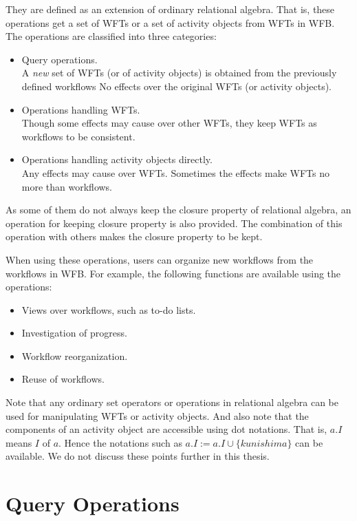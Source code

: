 They are defined as an extension of ordinary relational algebra.  That
is, these operations get a set of WFTs or a set of activity objects from
WFTs in WFB\@.  The operations are classified into three categories:
\begin{itemize}
 \item Query operations.\\
       A {\it new} set of WFTs (or of activity objects) is obtained from
       the previously defined workflows  No effects over the original
       WFTs (or activity objects).
 \item Operations handling WFTs.\\
       Though some effects may cause over other WFTs, they keep WFTs as
       workflows to be consistent.
 \item Operations handling activity objects directly.\\
       Any effects may cause over WFTs.  Sometimes the effects make WFTs 
       no more than workflows.
\end{itemize}
As some of them do not always keep the closure property of relational
algebra, an operation for keeping closure property is also provided.
The combination of this operation with others makes the closure property
to be kept.

When using these operations, users can organize new workflows from the
workflows in WFB\@.  For example, the following functions are available
using the operations:
\begin{itemize}
\itemsep0mm\parskip0mm
 \item Views over workflows, such as to-do lists.
 \item Investigation of progress.
 \item Workflow reorganization.
 \item Reuse of workflows.
\end{itemize}

Note that any ordinary set operators or operations in relational algebra
can be used for manipulating WFTs or activity objects.  And also note
that the components of an activity object are accessible using dot
notations.  That is, $a.I$ means $I$ of $a$.  Hence the notations such
as $a.I := a.I \cup \{kunishima\}$ can be available.  We do not discuss
these points further in this thesis.

\section{Query Operations}
\label{sec:retrieveop}

